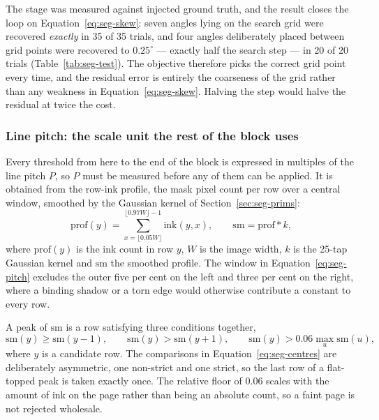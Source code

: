 The stage was measured against injected ground truth, and the result closes the loop on Equation~\ref{eq:seg-skew}: seven angles lying on the search grid were recovered \emph{exactly} in 35 of 35 trials, and four angles deliberately placed between grid points were recovered to $0.25^\circ$ --- exactly half the search step --- in 20 of 20 trials (Table~\ref{tab:seg-test}). The objective therefore picks the correct grid point every time, and the residual error is entirely the coarseness of the grid rather than any weakness in Equation~\ref{eq:seg-skew}. Halving the step would halve the residual at twice the cost.

\subsubsection{Line pitch: the scale unit the rest of the block uses}
\label{sec:seg-pitch}
\label{sec:seg-pitchcentres}

Every threshold from here to the end of the block is expressed in multiples of the line pitch $P$, so $P$ must be measured before any of them can be applied. It is obtained from the row-ink profile, the mask pixel count per row over a central window, smoothed by the Gaussian kernel of Section~\ref{sec:seg-prims}:
\begin{equation}
\mathrm{prof}(y)=\sum_{x=\lfloor0.05W\rfloor}^{\lfloor0.97W\rfloor-1}\mathrm{ink}(y,x),\qquad \mathrm{sm}=\mathrm{prof}*k,
\label{eq:seg-pitch}
\end{equation}
where $\mathrm{prof}(y)$ is the ink count in row $y$, $W$ is the image width, $k$ is the 25-tap Gaussian kernel and $\mathrm{sm}$ the smoothed profile. The window in Equation~\ref{eq:seg-pitch} excludes the outer five per cent on the left and three per cent on the right, where a binding shadow or a torn edge would otherwise contribute a constant to every row.

A peak of $\mathrm{sm}$ is a row satisfying three conditions together,
\begin{equation}
\mathrm{sm}(y)\ge\mathrm{sm}(y-1),\qquad \mathrm{sm}(y)>\mathrm{sm}(y+1),\qquad \mathrm{sm}(y)>0.06\max_u\mathrm{sm}(u),
\label{eq:seg-centres}
\end{equation}
where $y$ is a candidate row. The comparisons in Equation~\ref{eq:seg-centres} are deliberately asymmetric, one non-strict and one strict, so the last row of a flat-topped peak is taken exactly once. The relative floor of $0.06$ scales with the amount of ink on the page rather than being an absolute count, so a faint page is not rejected wholesale.

